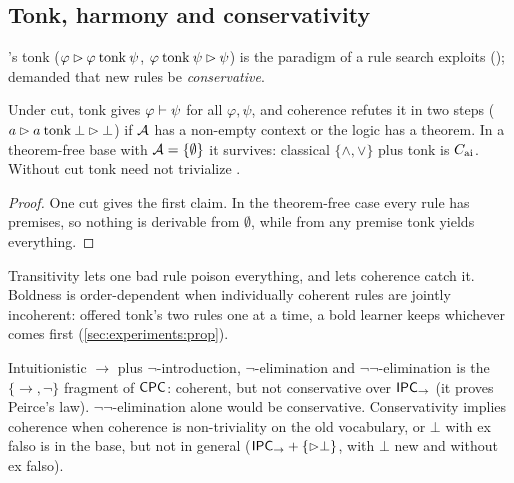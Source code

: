 \subsection{Tonk, harmony and conservativity}\label{sec:coherence:tonk}

\citet{prior1960runabout}'s tonk ($\varphi\rhd\varphi\mathbin{\mathrm{tonk}}\psi$, $\varphi\mathbin{\mathrm{tonk}}\psi\rhd\psi$) is the paradigm of a rule search exploits (); \citet{belnap1962tonk} demanded that new rules be \emph{conservative}.

\begin{proposition}[Tonk]\label{prop:coherence:tonk}
Under cut, tonk gives $\varphi\vdash\psi$ for all $\varphi,\psi$, and coherence refutes it in two steps ($a\rhd a\mathbin{\mathrm{tonk}}\bot\rhd\bot$) if $\mathcal{A}$ has a non-empty context or the logic has a theorem. In a theorem-free base with $\mathcal{A}=\{\emptyset\}$ it survives: classical $\{\wedge,\vee\}$ plus tonk is $C_{\mathrm{ai}}$. Without cut tonk need not trivialize \citep{cook2005whats,ripley2015anything}.
\end{proposition}

\begin{proof}
One cut gives the first claim. In the theorem-free case every rule has premises, so nothing is derivable from $\emptyset$, while from any premise tonk yields everything.
\end{proof}

Transitivity lets one bad rule poison everything, and lets coherence catch it. Boldness is order-dependent when individually coherent rules are jointly incoherent: offered tonk's two rules one at a time, a bold learner keeps whichever comes first (\cref{sec:experiments:prop}).

\begin{proposition}\label{prop:coherence:conservativity}
Intuitionistic $\to$ plus $\neg$-introduction, $\neg$-elimination and $\neg\neg$-elimination is the $\{\to,\neg\}$ fragment of $\mathsf{CPC}$: coherent, but not conservative over $\mathsf{IPC}_\to$ (it proves Peirce's law). $\neg\neg$-elimination alone would be conservative. Conservativity implies coherence when coherence is non-triviality on the old vocabulary, or $\bot$ with ex falso is in the base, but not in general ($\mathsf{IPC}_\to+\{\rhd\bot\}$, with $\bot$ new and without ex falso).
\end{proposition}

